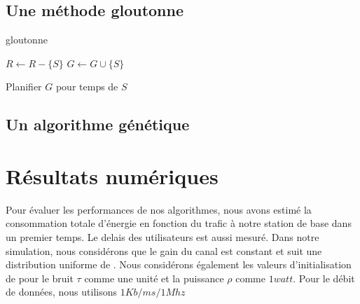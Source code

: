 \documentclass[runningheads]{llncs}
\begin{document}
\subsection{Une m\'ethode gloutonne}
\begin{algorithm}[H]
    \caption{gloutonne}%
    \label{alg:greedy}
    \begin{algorithmic}[1]
        \State $ R \gets R - \{S\}$
        \State $ G \gets G \cup \{S\}$
      
          \EndIf{}
       \EndFor{}
       Planifier $G$ pour temps de $S$
      \EndWhile{}
    \end{algorithmic}
  \end{algorithm}

\subsection{Un algorithme g\'en\'etique}

\section{R\'esultats num\'eriques}
Pour évaluer les performances de nos algorithmes, nous avons estimé la 
consommation totale d'énergie en fonction du trafic à notre station de 
base dans un premier temps. Le delais des utilisateurs est aussi mesur\'e.
Dans notre simulation, nous considérons que le gain du canal est constant 
et suit une distribution uniforme de \cite{huang2016}.
Nous considérons également les valeurs d'initialisation de \cite{huang2016} 
pour le bruit $ \tau $ comme une unité et la puissance $ \rho $ comme 
$ 1 watt $. Pour le débit de données, nous utilisons $1Kb/ms/1Mhz$
\end{document}
